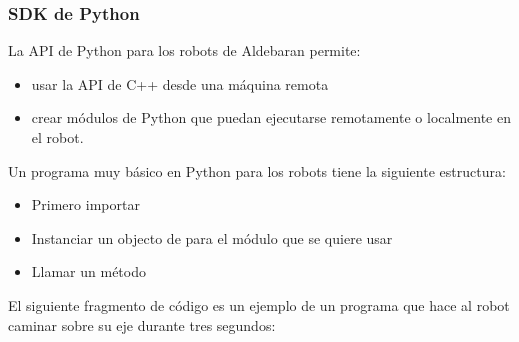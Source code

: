 \subsubsection{SDK de Python}
\label{\detokenize{chapter_one/naoqi:sdk-de-python}}
La API de Python para los robots de Aldebaran permite:
\begin{itemize}
\item {} 
usar la API de C++ desde una máquina remota

\item {} 
crear módulos de Python que puedan ejecutarse remotamente o localmente en el robot.

\end{itemize}

Un programa muy básico en Python para los robots tiene la siguiente estructura:
\begin{itemize}
\item {} 
Primero importar 

\item {} 
Instanciar un objecto de  para el módulo que se quiere usar

\item {} 
Llamar un método

\end{itemize}

El siguiente fragmento de código es un ejemplo de un programa que hace al robot
caminar sobre su eje  durante tres segundos:

\begin{sphinxVerbatim}[commandchars=\\\{\}]
 
    

     

 
  
  
  

  


\end{sphinxVerbatim}


